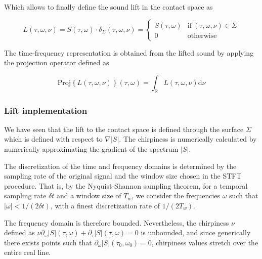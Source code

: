\documentclass[american,]{article}
\theoremstyle{definition}
\theoremstyle{definition}
\theoremstyle{definition}
\theoremstyle{remark}
\begin{document}
Which allows to finally define the sound lift in the contact space as

\begin{equation}
L(\tau,\omega,\nu) = S(\tau,\omega)\cdot\delta_\Sigma (\tau,\omega,\nu) =
\begin{cases}
S(\tau,\omega) & \text{if}~(\tau,\omega,\nu)\in\Sigma\\
0          & \text{otherwise}
\end{cases}
\end{equation}

The time-frequency representation is obtained from the lifted sound
by applying the projection operator defined as

\begin{equation}
\mathrm{Proj}\left\{L(\tau,\omega,\nu)\right\}(\tau,\omega) = \int_\mathbb{R}L(\tau,\omega,\nu)\mathrm{d}\nu
\end{equation}

\hypertarget{lift-implementation}{%
\subsubsection{Lift implementation}\label{lift-implementation}}

We have seen that the lift to the contact space is defined through
the surface \(\Sigma\) which is defined with respect to \(\nabla\left\lvert S\right\rvert\).
The chirpiness is numerically calculated by numerically approximating
the gradient of the spectrum \(\left\lvert S\right\rvert\).

The discretization of the time and frequency domains is determined by
the sampling rate of the original signal and the window size
chosen in the STFT procedure.
That is, by the Nyquist-Shannon sampling theorem,
for a temporal sampling rate \(\delta t\) and a window size of \(T_w\),
we consider the frequencies \(\omega\) such that \(|\omega|<1/(2\delta t)\),
with a finest discretization rate of \(1/(2T_w)\).

The frequency domain is therefore bounded.
Nevertheless, the chirpiness \(\nu\) defined as
\(\nu\partial_\omega\left\lvert S\right\rvert(\tau,\omega) + \partial_\tau\left\lvert S\right\rvert(\tau,\omega)=0\) is unbounded,
and since generically there exists points such that
\(\partial_\omega\left\lvert S\right\rvert(\tau_0,\omega_0)=0\),
chirpiness values stretch over the entire real line.
\end{document}
